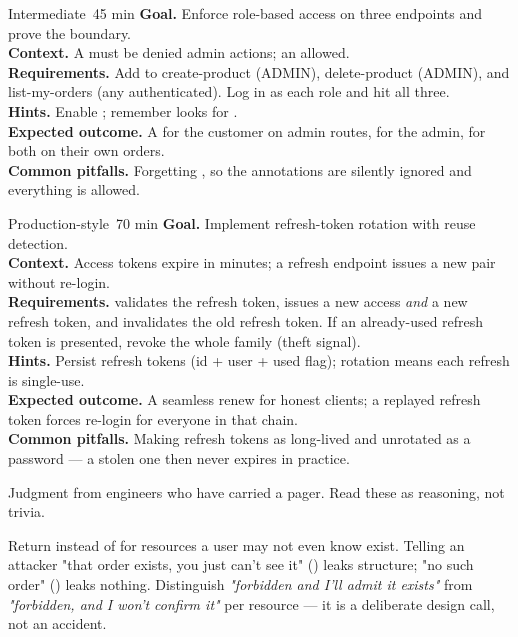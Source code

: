 \begin{minilab}{Intermediate}{~45 min}
\textbf{Goal.} Enforce role-based access on three endpoints and prove the boundary.\\
\textbf{Context.} A  must be denied admin actions; an  allowed.\\
\textbf{Requirements.} Add  to create-product (ADMIN), delete-product (ADMIN), and list-my-orders (any authenticated). Log in as each role and hit all three.\\
\textbf{Hints.} Enable ; remember  looks for .\\
\textbf{Expected outcome.} A  for the customer on admin routes,  for the admin,  for both on their own orders.\\
\textbf{Common pitfalls.} Forgetting , so the annotations are silently ignored and everything is allowed.
\end{minilab}

\begin{minilab}{Production-style}{~70 min}
\textbf{Goal.} Implement refresh-token rotation with reuse detection.\\
\textbf{Context.} Access tokens expire in minutes; a refresh endpoint issues a new pair without re-login.\\
\textbf{Requirements.}  validates the refresh token, issues a new access \emph{and} a new refresh token, and invalidates the old refresh token. If an already-used refresh token is presented, revoke the whole family (theft signal).\\
\textbf{Hints.} Persist refresh tokens (id + user + used flag); rotation means each refresh is single-use.\\
\textbf{Expected outcome.} A seamless renew for honest clients; a replayed refresh token forces re-login for everyone in that chain.\\
\textbf{Common pitfalls.} Making refresh tokens as long-lived and unrotated as a password --- a stolen one then never expires in practice.
\end{minilab}


Judgment from engineers who have carried a pager. Read these as reasoning, not trivia.

\begin{seniornote}
Return  instead of  for resources a user may not even know exist. Telling an attacker "that order exists, you just can't see it" () leaks structure; "no such order" () leaks nothing. Distinguish \emph{"forbidden and I'll admit it exists"} from \emph{"forbidden, and I won't confirm it"} per resource --- it is a deliberate design call, not an accident.
\end{seniornote}

